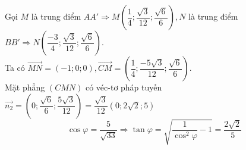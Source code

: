 \begin{ex}
{{\begin{tikzpicture}[scale=1, font=\footnotesize, line join=round, line cap=round, >=stealth]
		\end{tikzpicture}}\noindent
		Gọi $M$ là trung điểm $AA' \Rightarrow M\left(\dfrac{1}{4} ; \dfrac{\sqrt{3}}{12} ; \dfrac{\sqrt{6}}{6}\right), N$ là trung điểm $BB' \Rightarrow N\left(\dfrac{-3}{4} ; \dfrac{\sqrt{3}}{12} ; \dfrac{\sqrt{6}}{6}\right)$.\\
		Ta có $\overrightarrow{MN}=(-1 ; 0 ; 0), \overrightarrow{CM}=\left(\dfrac{1}{4} ; \dfrac{-5 \sqrt{3}}{12} ; \dfrac{\sqrt{6}}{6}\right)$.\\
		Mặt phẳng $(CMN)$ có véc-tơ pháp tuyến $\overrightarrow{n_2}=\left(0 ; \dfrac{\sqrt{6}}{6} ; \dfrac{5 \sqrt{3}}{12}\right)=\dfrac{\sqrt{3}}{12}(0 ; 2 \sqrt{2} ; 5)$
		\[\cos \varphi=\dfrac{5}{\sqrt{33}} \Rightarrow \tan \varphi=\sqrt{\frac{1}{\cos ^2 \varphi}-1}=\dfrac{2 \sqrt{2}}{5}\]
	}
\end{ex}
